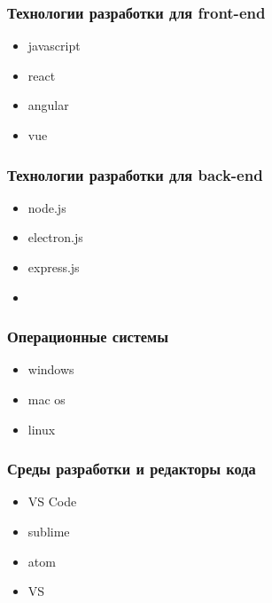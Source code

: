     \subsubsection{Технологии разработки для front-end}
        \begin{itemize}
            \item javascript
            \item react
            \item angular
            \item vue
        \end{itemize}

    \subsubsection{Технологии разработки для back-end}
        \begin{itemize}
            \item node.js
            \item electron.js
            \item express.js
            \item 
        \end{itemize}

    \subsubsection{Операционные системы}
        \begin{itemize}
            \item windows
            \item mac os
            \item linux
        \end{itemize}
        
    \subsubsection{Среды разработки и редакторы кода}
        \begin{itemize}
            \item VS Code
            \item sublime
            \item atom
            \item VS
        \end{itemize}
    
